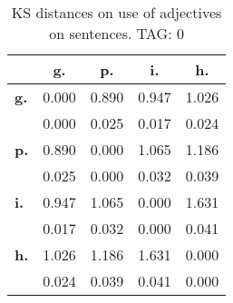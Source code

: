 \begin{table}[h!]
\begin{center}
\begin{tabular}{| l || c | c | c | c |}\hline
 & {\bf g.} & {\bf p.} & {\bf i.} & {\bf h.} \\\hline\hline
{\bf g.} & 0.000 & 0.890 & 0.947 & 1.026 \\
{\bf } & 0.000 & 0.025 & 0.017 & 0.024 \\\hline
{\bf p.} & 0.890 & 0.000 & 1.065 & 1.186 \\
{\bf } & 0.025 & 0.000 & 0.032 & 0.039 \\\hline
{\bf i.} & 0.947 & 1.065 & 0.000 & 1.631 \\
{\bf } & 0.017 & 0.032 & 0.000 & 0.041 \\\hline
{\bf h.} & 1.026 & 1.186 & 1.631 & 0.000 \\
{\bf } & 0.024 & 0.039 & 0.041 & 0.000 \\\hline
\end{tabular}
\caption{KS distances on use of adjectives on sentences. TAG: 0}
\end{center}
\end{table}